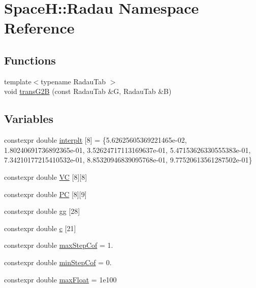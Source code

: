\hypertarget{namespace_space_h_1_1_radau}{}\section{SpaceH\+:\+:Radau Namespace Reference}
\label{namespace_space_h_1_1_radau}
\subsection*{Functions}
\begin{DoxyCompactItemize}
\item 
{\footnotesize template$<$typename Radau\+Tab $>$ }\\void \mbox{\hyperlink{namespace_space_h_1_1_radau_ac20bc7d0c1a878276e64f05506b875e5}{trans\+G2B}} (const Radau\+Tab \&G, Radau\+Tab \&B)
\end{DoxyCompactItemize}
\subsection*{Variables}
\begin{DoxyCompactItemize}
\item 
constexpr double \mbox{\hyperlink{namespace_space_h_1_1_radau_ace842233b380d237a5275cf16462ceeb}{interplt}} \mbox{[}8\mbox{]} = \{5.\+62625605369221465e-\/02, 1.\+80240691736892365e-\/01, 3.\+52624717113169637e-\/01, 5.\+47153626330555383e-\/01, 7.\+34210177215410532e-\/01, 8.\+85320946839095768e-\/01, 9.\+77520613561287502e-\/01\}
\item 
constexpr double \mbox{\hyperlink{namespace_space_h_1_1_radau_a9fb1c247de193221b47ce294964aa06b}{VC}} \mbox{[}8\mbox{]}\mbox{[}8\mbox{]}
\item 
constexpr double \mbox{\hyperlink{namespace_space_h_1_1_radau_a24cc5eaca3250fc45186dd96873afe73}{PC}} \mbox{[}8\mbox{]}\mbox{[}9\mbox{]}
\item 
constexpr double \mbox{\hyperlink{namespace_space_h_1_1_radau_a4b01e8b6450f665f02918969259eea09}{gg}} \mbox{[}28\mbox{]}
\item 
constexpr double \mbox{\hyperlink{namespace_space_h_1_1_radau_a8ef5a0de3fa20bfed420d08e5b85dcd9}{c}} \mbox{[}21\mbox{]}
\item 
constexpr double \mbox{\hyperlink{namespace_space_h_1_1_radau_aa4b3264817117df4b43f0b8a176edf69}{max\+Step\+Cof}} = 1.
\item 
constexpr double \mbox{\hyperlink{namespace_space_h_1_1_radau_a4f2cef8d9622ff78d76403b062ec33a7}{min\+Step\+Cof}} = 0.
\item 
constexpr double \mbox{\hyperlink{namespace_space_h_1_1_radau_aa1696f42694bdb9870e499a1cf1068d9}{max\+Float}} = 1e100
\end{DoxyCompactItemize}


